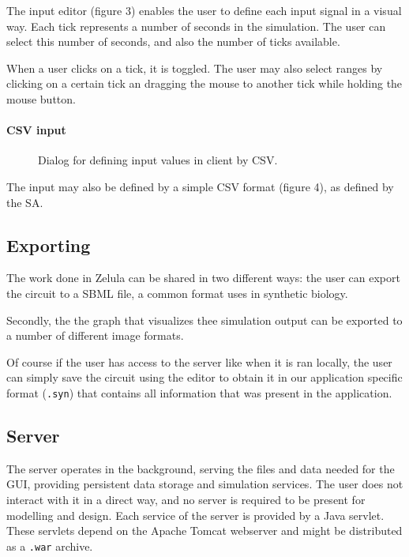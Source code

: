 \noindent The input editor (figure 3) enables the user to define each input signal in a visual way. Each tick represents a number of seconds in the simulation. The user can select this number of seconds, and also the number of ticks available.

When a user clicks on a tick, it is toggled. The user may also select ranges by clicking on a certain tick an dragging the mouse to another tick while holding the mouse button.

\newpage
\paragraph{CSV input}
\begin{figure}[h!]
\centering{}
\caption{Dialog for defining input values in client by CSV.}
\end{figure}

\noindent The input may also be defined by a simple CSV format (figure 4), as defined by the SA.

\subsection{Exporting}
The work done in Zelula can be shared in two different ways: the user can export the circuit to a SBML file, a common format uses in synthetic biology.

Secondly, the the graph that visualizes thee simulation output can be exported to a number of different image formats.

Of course if the user has access to the server like when it is ran locally, the user can simply save the circuit using the editor to obtain it in our application specific format (\verb=.syn=) that contains all information that was present in the application.

\subsection{Server}
The server operates in the background, serving the files and data needed for the GUI, providing persistent data storage and simulation services. The user does not interact with it in a direct way, and no server is required to be present for modelling and design. Each service of the server is provided by a Java servlet. These servlets depend on the Apache Tomcat webserver and might be distributed as a \verb|.war| archive. 
